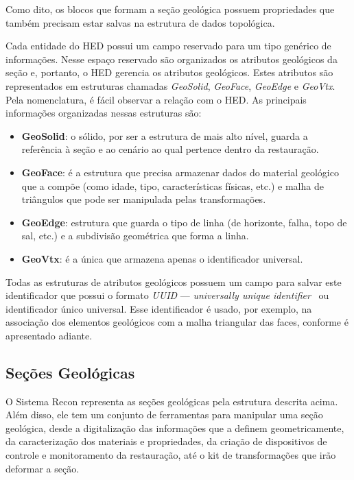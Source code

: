 Como dito, os blocos que formam a seção geológica possuem propriedades que também precisam estar salvas na estrutura de dados topológica.

Cada entidade do HED possui um campo reservado para um tipo genérico de informações. Nesse espaço reservado são organizados os atributos geológicos da seção e, portanto, o HED gerencia os atributos geológicos. Estes atributos são representados em estruturas chamadas \textit{GeoSolid}, \textit{GeoFace}, \textit{GeoEdge} e \textit{GeoVtx}. Pela nomenclatura, é fácil observar a relação com o HED. As principais informações organizadas nessas estruturas são:

\renewcommand{\labelitemi}{•}
\begin{itemize}
  \item \textbf{GeoSolid}: o sólido, por ser a estrutura de mais alto nível, guarda a referência à seção e ao cenário ao qual pertence dentro da restauração.
  \item \textbf{GeoFace}: é a estrutura que precisa armazenar dados do material geológico que a compõe (como idade, tipo, características físicas, etc.) e malha de triângulos que pode ser manipulada pelas transformações.
  \item \textbf{GeoEdge}: estrutura que guarda o tipo de linha (de horizonte, falha, topo de sal, etc.) e a subdivisão geométrica que forma a linha. 
  \item \textbf{GeoVtx}: é a única que armazena apenas o identificador universal.
\end{itemize}

Todas as estruturas de atributos geológicos possuem um campo para salvar este identificador que possui o formato \textit{UUID} --- \textit{universally unique identifier}~\cite{UUID} ou identificador único universal. Esse identificador é usado, por exemplo, na associação dos elementos geológicos com a malha triangular das faces, conforme é apresentado adiante.

\subsection{Seções Geológicas} %

O Sistema Recon representa as seções geológicas pela estrutura descrita acima. Além disso, ele tem um conjunto de ferramentas para manipular uma seção geológica, desde a digitalização das informações que a definem geometricamente, da caracterização dos materiais e propriedades, da criação de dispositivos de controle e monitoramento da restauração, até o kit de transformações que irão deformar a seção.

